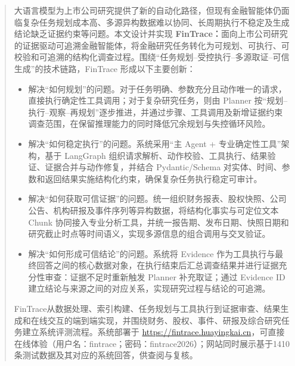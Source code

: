 \fintraceabstractheader
\begin{fintraceabstractpanel}
\begin{abstract}

大语言模型为上市公司研究提供了新的自动化路径，但现有金融智能体仍面临复杂任务规划成本高、多源异构数据难以协同、长周期执行不稳定及生成结论缺乏证据约束等问题。本文设计并实现 \textbf{FinTrace：}面向上市公司研究的证据驱动可追溯金融智能体，将金融研究任务转化为可规划、可执行、可校验和可追溯的结构化调查过程。围绕“任务规划--受控执行--多源取证--可信生成”的技术链路，FinTrace 形成以下主要创新：

\begin{itemize}[leftmargin=6mm,label=\textcolor{FinOrange}{\raisebox{.12ex}{\large$\bullet$}},itemsep=5pt,topsep=5pt]

\item {}
解决“如何规划”的问题。对于任务明确、参数充分且动作唯一的请求，直接执行确定性工具调用；对于复杂研究任务，则由 Planner 按“规划--执行--观察--再规划”逐步推进，并通过步骤、工具调用及新增证据约束调查范围，在保留推理能力的同时降低冗余规划与失控循环风险。

\item {}
解决“如何稳定执行”的问题。系统采用“主 Agent + 专业确定性工具”架构，基于 LangGraph 组织请求解析、动作校验、工具执行、结果验证、证据合并与动作修复，并结合 Pydantic/Schema 对实体、时间、参数和返回结果实施结构化约束，确保复杂任务执行稳定可审计。

\item {}
解决“如何获取可信证据”的问题。统一组织财务报表、股权快照、公司公告、机构研报及事件序列等异构数据，将结构化事实与可定位文本 Chunk 协同接入专业分析工具，并统一报告期、发布日期、快照日期和研究截止时点等时间语义，实现多源信息的组合调用与交叉验证。

\item {}
解决“如何形成可信结论”的问题。系统将 Evidence 作为工具执行与最终回答之间的核心数据对象，在执行结束后汇总调查结果并进行证据充分性审查：证据不足时重新触发 Planner 补充取证；通过 Evidence ID 建立结论与来源之间的对应关系，实现研究过程与结论的可追溯。

\end{itemize}

FinTrace从数据处理、索引构建、任务规划与工具执行到证据审查、结果生成和在线交互的端到端实现，并围绕财务、股权、事件、研报及综合研究任务建立系统评测流程。系统部署于 \url{https://fintrace.huayingkai.cn}，可直接在线体验（用户名：fintrace；密码：fintrace2026）；网站同时展示基于1410 条测试数据及其对应的系统回答，供查阅与复核。


\end{abstract}
\end{fintraceabstractpanel}

